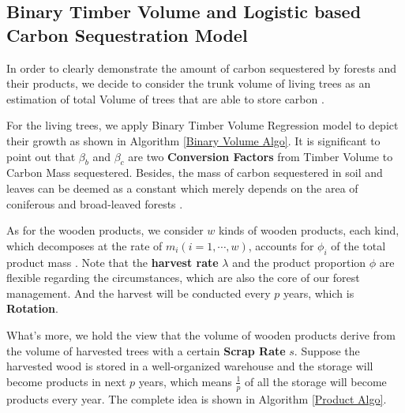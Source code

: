 \documentclass{mcmthesis}
\numberwithin{figure}{section}
\numberwithin{table}{section}
\numberwithin{equation}{section}
\begin{document}
\subsection{Binary Timber Volume and Logistic based Carbon Sequestration Model}

In order to clearly demonstrate the amount of carbon sequestered by forests and their
products, we decide to consider the trunk volume of living trees as an estimation of 
total Volume of trees that are able to store carbon \citep{WangYan}. 
\par
For the living trees, we apply Binary Timber Volume Regression model \citep{LuoQingbang} 
to depict their growth as shown in Algorithm \ref{Binary Volume Algo}. 
It is significant
to point out that $ \beta_b $ and $ \beta_c $ are two \textbf{Conversion Factors} from
Timber Volume to Carbon Mass sequestered. Besides, the mass of carbon sequestered in
soil and leaves can be deemed as a constant which merely depends on the area
of coniferous and broad-leaved forests \citep{YanDeren2011}. 
\par
As for the wooden products, we consider $ w $ kinds of wooden products, each kind,
which decomposes at the rate of $ m_i (i = 1,\cdots, w) $, accounts for $ \phi_i$ 
of the total product mass \citep{2006Forest}. Note that the \textbf{harvest rate} $ \lambda $ and the product
proportion $ \phi $ are flexible regarding the circumstances, which are also 
the core of our forest management. And the harvest will be conducted every 
$ p $ years, which is \textbf{Rotation}. 
\par
What's more, we hold the view that 
the volume of wooden products derive from the volume of harvested trees with a certain
\textbf{Scrap Rate} $ s $. Suppose the harvested wood is stored in a well-organized
warehouse and the storage will become products in next $ p $ years, which means 
 $ \frac{1}{p} $ of all the storage will become products every year.
The complete idea is shown in Algorithm \ref{Product Algo}.
\par
\end{document}
